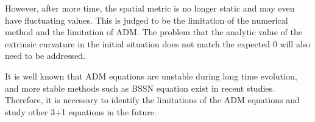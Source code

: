 However, after more time, the spatial metric is no longer static and may even have fluctuating values. This is judged to be the limitation of the numerical method and the limitation of ADM. The problem that the analytic value of the extrinsic curvature in the initial situation does not match the expected 0 will also need to be addressed.

It is well known that ADM equations are unstable during long time evolution, and more stable methods such as BSSN equation exist in recent studies. Therefore, it is necessary to identify the limitations of the ADM equations and study other 3+1 equations in the future.


